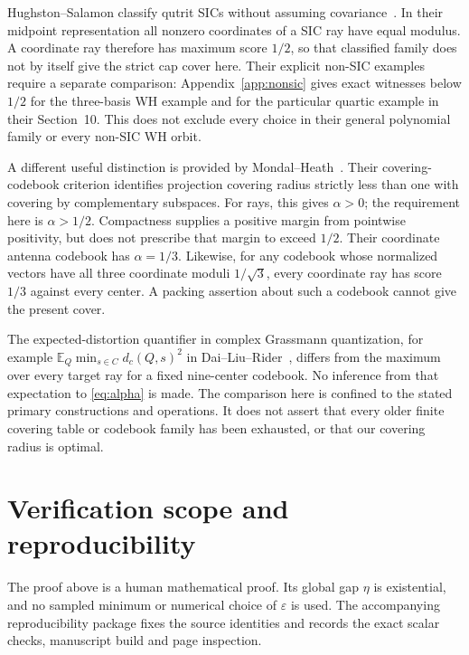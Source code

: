 \documentclass[11pt,a4paper]{article}
\theoremstyle{remark}
\numberwithin{equation}{section}
\begin{document}
Hughston--Salamon classify qutrit SICs without assuming covariance~\cite{HS}. In their midpoint representation all nonzero coordinates of a SIC ray have equal modulus. A coordinate ray therefore has maximum score $1/2$, so that classified family does not by itself give the strict cap cover here. Their explicit non-SIC examples require a separate comparison: Appendix~\ref{app:nonsic} gives exact witnesses below $1/2$ for the three-basis WH example and for the particular quartic example in their Section~10. This does not exclude every choice in their general polynomial family or every non-SIC WH orbit.

A different useful distinction is provided by Mondal--Heath~\cite[Theorem~1 and Appendix~A]{MH}. Their covering-codebook criterion identifies projection covering radius strictly less than one with covering by complementary subspaces. For rays, this gives $\alpha>0$; the requirement here is $\alpha>1/2$. Compactness supplies a positive margin from pointwise positivity, but does not prescribe that margin to exceed $1/2$. Their coordinate antenna codebook has $\alpha=1/3$. Likewise, for any codebook whose normalized vectors have all three coordinate moduli $1/\sqrt3$, every coordinate ray has score $1/3$ against every center. A packing assertion about such a codebook cannot give the present cover.

The expected-distortion quantifier in complex Grassmann quantization, for example $\mathbb E_Q\min_{s\in C}d_c(Q,s)^2$ in Dai--Liu--Rider~\cite{DLR}, differs from the maximum over every target ray for a fixed nine-center codebook. No inference from that expectation to \eqref{eq:alpha} is made. The comparison here is confined to the stated primary constructions and operations. It does not assert that every older finite covering table or codebook family has been exhausted, or that our covering radius is optimal.

\section{Verification scope and reproducibility}\label{sec:verification}
The proof above is a human mathematical proof. Its global gap $\eta$ is existential, and no sampled minimum or numerical choice of $\varepsilon$ is used. The accompanying reproducibility package fixes the source identities and records the exact scalar checks, manuscript build and page inspection.
\end{document}
